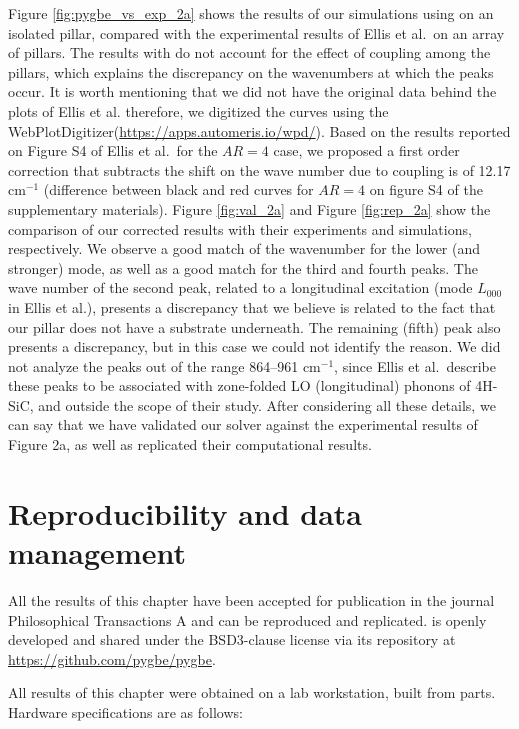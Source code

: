 Figure \ref{fig:pygbe_vs_exp_2a} shows the results of our simulations using \pygbe on an isolated pillar, compared with the experimental results
of Ellis et al.\ on an array of pillars. The results with \pygbe do not account for the effect of coupling among the pillars, which explains the  
discrepancy on the wavenumbers at which the peaks occur. It is worth mentioning that we did not have the original data behind the plots of 
Ellis et al. therefore, we digitized the curves using the WebPlotDigitizer(\url{https://apps.automeris.io/wpd/}). Based on the results reported 
on Figure S4 of Ellis et al.\ for the $AR=4$ case, we proposed a first order correction that subtracts the shift on the wave number due to
coupling is of 12.17 cm$^{-1}$ (difference between black and red curves for $AR=4$ on figure S4 of the supplementary materials). Figure \ref{fig:val_2a}
and Figure \ref{fig:rep_2a} show the comparison of our corrected results with their experiments and simulations, respectively. We observe a good match 
of the wavenumber for the lower (and stronger) mode, as well as a good match for the third and fourth peaks. The wave number of the second peak, related 
to a longitudinal excitation (mode $L_{000}$ in Ellis et al.), presents a discrepancy that we believe is related to the fact that our 
pillar does not have a substrate underneath. The remaining (fifth) peak also presents a discrepancy, but in this case we could not identify the reason.
We did not analyze the peaks out of the range 864--961 cm$^{-1}$, since Ellis et al.\ describe these peaks to be associated with 
zone-folded LO (longitudinal) phonons of 4H-SiC, and outside the scope of their study.
After considering all these details, we can say that we have validated our solver \pygbe against the experimental results of 
Figure 2a, as well as replicated their computational results.

\section{Reproducibility and data management} \label{sec:repro_val}
 
All the results of this chapter have been accepted for publication in the journal 
Philosophical Transactions A \cite{ClementiBarba2020} and can be reproduced and replicated. \pygbe is openly developed and 
shared under the BSD3-clause license via its repository at \url{https://github.com/pygbe/pygbe}.

All results of this chapter were obtained on a lab workstation, built from parts. Hardware specifications are as follows:

